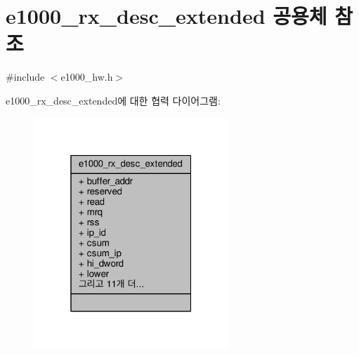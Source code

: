 \hypertarget{unione1000__rx__desc__extended}{}\section{e1000\+\_\+rx\+\_\+desc\+\_\+extended 공용체 참조}
\label{unione1000__rx__desc__extended}


{\ttfamily \#include $<$e1000\+\_\+hw.\+h$>$}



e1000\+\_\+rx\+\_\+desc\+\_\+extended에 대한 협력 다이어그램\+:
\nopagebreak
\begin{figure}[H]
\begin{center}
\leavevmode
\includegraphics[width=208pt]{unione1000__rx__desc__extended__coll__graph}
\end{center}
\end{figure}
